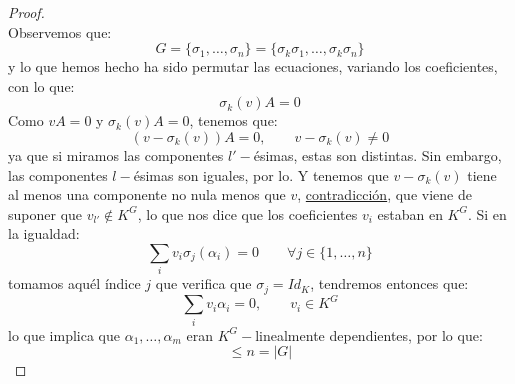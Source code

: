 \begin{prop}[Artin]
\begin{proof}
\begin{equation*}
        \end{equation*}
        Observemos que:
        \begin{equation*}
            G = \{\sigma_1, \ldots, \sigma_n\} = \{\sigma_k\sigma_1, \ldots, \sigma_k\sigma_n\}
        \end{equation*}
        y lo que hemos hecho ha sido permutar las ecuaciones, variando los coeficientes, con lo que:
        \begin{equation*}
            \sigma_k(v)A = 0
        \end{equation*}
        Como $vA = 0$ y $\sigma_k(v)A=0$, tenemos que:
        \begin{equation*}
            (v-\sigma_k(v))A = 0, \qquad v-\sigma_k(v) \neq 0
        \end{equation*}
        ya que si miramos las componentes $l'-$ésimas, estas son distintas. Sin embargo, las componentes $l-$ésimas son iguales, por lo. Y tenemos que $v-\sigma_k(v)$ tiene al menos una componente no nula menos que $v$, \underline{contradicción}, que viene de suponer que $v_{l'}\notin K^G$, lo que nos dice que los coeficientes $v_i$ estaban en $K^G$. Si en la igualdad: 
        \begin{equation*}
            \sum_i v_i \sigma_j(\alpha_i) = 0 \qquad \forall j \in \{1,\ldots,n\}
        \end{equation*}
        tomamos aquél índice $j$ que verifica que $\sigma_j = Id_K$, tendremos entonces que:
        \begin{equation*}
            \sum_{i}v_i \alpha_i = 0, \qquad v_i \in K^G
        \end{equation*}
        lo que implica que $\alpha_1, \ldots, \alpha_m$ eran $K^G-$linealmente dependientes, por lo que:
        \begin{equation*}
            [K:K^G] \leq n = |G|
        \end{equation*}
    \end{proof}
\end{prop}

